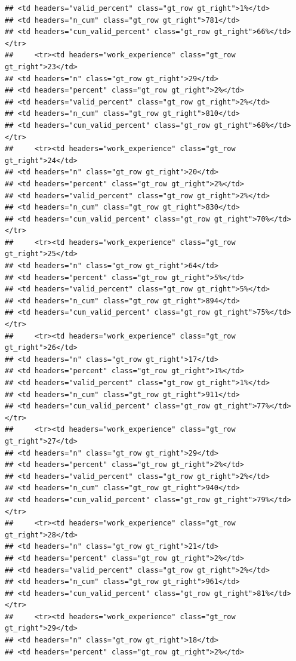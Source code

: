 \documentclass[
  a4paper,
  DIV=11,
  numbers=noendperiod]{scrartcl}
\begin{document}
\begin{verbatim}
## <td headers="valid_percent" class="gt_row gt_right">1%</td>
## <td headers="n_cum" class="gt_row gt_right">781</td>
## <td headers="cum_valid_percent" class="gt_row gt_right">66%</td></tr>
##     <tr><td headers="work_experience" class="gt_row gt_right">23</td>
## <td headers="n" class="gt_row gt_right">29</td>
## <td headers="percent" class="gt_row gt_right">2%</td>
## <td headers="valid_percent" class="gt_row gt_right">2%</td>
## <td headers="n_cum" class="gt_row gt_right">810</td>
## <td headers="cum_valid_percent" class="gt_row gt_right">68%</td></tr>
##     <tr><td headers="work_experience" class="gt_row gt_right">24</td>
## <td headers="n" class="gt_row gt_right">20</td>
## <td headers="percent" class="gt_row gt_right">2%</td>
## <td headers="valid_percent" class="gt_row gt_right">2%</td>
## <td headers="n_cum" class="gt_row gt_right">830</td>
## <td headers="cum_valid_percent" class="gt_row gt_right">70%</td></tr>
##     <tr><td headers="work_experience" class="gt_row gt_right">25</td>
## <td headers="n" class="gt_row gt_right">64</td>
## <td headers="percent" class="gt_row gt_right">5%</td>
## <td headers="valid_percent" class="gt_row gt_right">5%</td>
## <td headers="n_cum" class="gt_row gt_right">894</td>
## <td headers="cum_valid_percent" class="gt_row gt_right">75%</td></tr>
##     <tr><td headers="work_experience" class="gt_row gt_right">26</td>
## <td headers="n" class="gt_row gt_right">17</td>
## <td headers="percent" class="gt_row gt_right">1%</td>
## <td headers="valid_percent" class="gt_row gt_right">1%</td>
## <td headers="n_cum" class="gt_row gt_right">911</td>
## <td headers="cum_valid_percent" class="gt_row gt_right">77%</td></tr>
##     <tr><td headers="work_experience" class="gt_row gt_right">27</td>
## <td headers="n" class="gt_row gt_right">29</td>
## <td headers="percent" class="gt_row gt_right">2%</td>
## <td headers="valid_percent" class="gt_row gt_right">2%</td>
## <td headers="n_cum" class="gt_row gt_right">940</td>
## <td headers="cum_valid_percent" class="gt_row gt_right">79%</td></tr>
##     <tr><td headers="work_experience" class="gt_row gt_right">28</td>
## <td headers="n" class="gt_row gt_right">21</td>
## <td headers="percent" class="gt_row gt_right">2%</td>
## <td headers="valid_percent" class="gt_row gt_right">2%</td>
## <td headers="n_cum" class="gt_row gt_right">961</td>
## <td headers="cum_valid_percent" class="gt_row gt_right">81%</td></tr>
##     <tr><td headers="work_experience" class="gt_row gt_right">29</td>
## <td headers="n" class="gt_row gt_right">18</td>
## <td headers="percent" class="gt_row gt_right">2%</td>

\end{verbatim}
\end{document}
